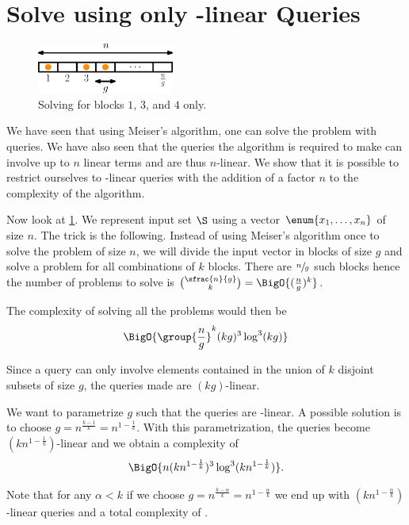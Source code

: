 \section{Solve \kSUM using only -linear Queries}


\begin{figure}
\centering
\includegraphics[width=0.4\textwidth]{fig/point-location/blocks}
\caption{Solving \kSUM for blocks \(1\), \(3\), and \(4\) only.}
\label{fig:point-location:on:blocks}
\end{figure}

We have seen that using Meiser's algorithm, one can solve the \kSUM problem
with  queries. We have also seen that the queries the
algorithm is required to make can involve up to \(n\) linear terms and are thus
\(n\)-linear. We show that it is possible to restrict ourselves to
-linear queries with the addition of a factor \(n\) to the complexity
of the algorithm.

Now look at \ref{fig:point-location:on:blocks}. We represent input set \(\S\)
using a vector \(\enum{x_1,\ldots,x_n}\) of size \(n\). The trick is the
following. Instead of using Meiser's algorithm once to solve the problem of
size \(n\), we will divide the input vector in blocks of size \(g\) and solve a
\kSUM problem for all combinations of \(k\) blocks. There are \(\sfrac{n}{g}\)
such blocks hence the number of problems to solve is \(\binom{\sfrac{n}{g}}{k}
= \BigO{(\frac{n}{g})^k} \).

The complexity of solving all the problems would then be
\begin{displaymath}
\BigO{\group{\frac{n}{g}}^k (kg)^3 \log^3 (kg) }
\end{displaymath}

Since a query can only involve elements contained in the union of \(k\)
disjoint subsets of size \(g\), the queries made are \((kg)\)-linear.

We want to parametrize \(g\) such that the queries are -linear. A
possible solution is to choose \(g = n^{\frac{k-1}{k}} = n^{1-\frac{1}{k}}\).
With this parametrization, the queries become \((kn^{1-\frac{1}{k}})\)-linear
and we obtain a complexity of
\begin{displaymath}
\BigO{n (kn^{1-\frac{1}{k}})^3 \log^3 (kn^{1-\frac{1}{k}}) }.
\end{displaymath}

Note that for any \(\alpha < k\) if we choose \(g = n^{\frac{k-\alpha}{k}} =
n^{1-\frac{\alpha}{k}}\) we end up with \((kn^{1-\frac{\alpha}{k}})\)-linear
queries and a total complexity of
.

